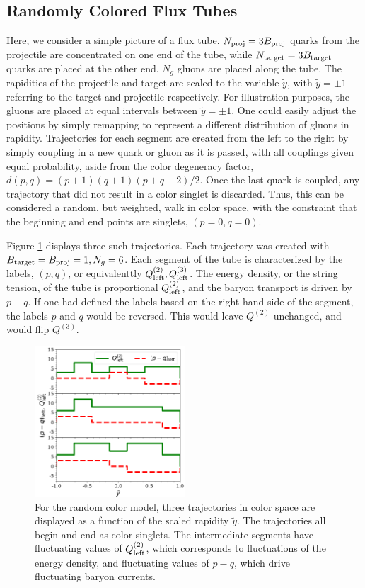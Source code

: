 \documentclass[aps, prc, 12pt, nofootinbib, showpacs, superscriptaddress, tightenlines, groupedaddress]{revtex4-2}
\begin{document}
\subsection{Randomly Colored Flux Tubes}

Here, we consider a simple picture of a flux tube. $N_{\rm proj}=3B_{\rm proj}$ quarks from the projectile are concentrated on one end of the tube, while $N_{\rm target}=3B_{\rm target}$ quarks are placed at the other end. $N_g$ gluons are placed along the tube. The rapidities of the projectile and target are scaled to the variable $\tilde{y}$, with $\tilde{y}=\pm 1$ referring to the target and projectile respectively. For illustration purposes, the gluons are placed at equal intervals between $\tilde{y}=\pm 1$. One could easily adjust the positions by simply remapping to represent a different distribution of gluons in rapidity. Trajectories for each segment are created from the left to the right by simply coupling in a new quark or gluon as it is passed, with all couplings given equal probability, aside from the color degeneracy factor, $d(p,q)=(p+1)(q+1)(p+q+2)/2$. Once the last quark is coupled, any trajectory that did not result in a color singlet is discarded. Thus, this can be considered a random, but weighted, walk in color space, with the constraint that the beginning and end points are singlets, $(p=0,q=0)$. 

Figure \ref{fig:sampletrajectories} displays three such trajectories. Each trajectory was created with $B_{\rm target}=B_{\rm proj}=1, N_g=6$. Each segment of the tube is characterized by the labels, $(p,q)$, or equivalenttly $Q^{(2)}_{\rm left},Q^{(3)}_{\rm left}$. The energy density, or the string tension, of the tube is proportional $Q^{(2)}_{\rm left}$, and the baryon transport is driven by $p-q$. If one had defined the labels based on the right-hand side of the segment, the labels $p$ and $q$ would be reversed. This would leave $Q^{(2)}$ unchanged, and would flip $Q^{(3)}$. 
\begin{figure}
\centerline{\includegraphics[width=0.5\textwidth]{figs/sample_trajectories.pdf}}
\caption{\label{fig:sampletrajectories}
For the random color model, three trajectories in color space are displayed as a function of the scaled rapidity $\tilde{y}$. The trajectories all begin and end as color singlets. The intermediate segments have fluctuating values of $Q^{(2)}_{\rm left}$, which corresponds to fluctuations of the energy density, and fluctuating values of $p-q$, which drive fluctuating baryon currents.
}
\end{figure}
\end{document}
